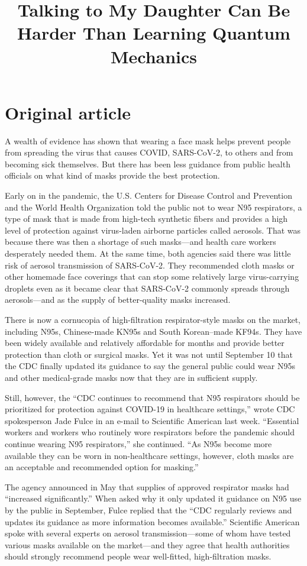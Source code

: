 \documentclass[a4paper, 14pt]{extarticle}
\title{Talking to My Daughter Can Be Harder Than Learning Quantum Mechanics}
\begin{document}

\section*{Original article}
A wealth of evidence has shown that wearing a face mask helps prevent people from spreading the virus that causes COVID, SARS-CoV-2, to others and from becoming sick themselves. But there has been less guidance from public health officials on what kind of masks provide the best protection.

Early on in the pandemic, the U.S. Centers for Disease Control and Prevention and the World Health Organization told the public not to wear N95 respirators, a type of mask that is made from high-tech synthetic fibers and provides a high level of protection against virus-laden airborne particles called aerosols. That was because there was then a shortage of such masks—and health care workers desperately needed them. At the same time, both agencies said there was little risk of aerosol transmission of SARS-CoV-2. They recommended cloth masks or other homemade face coverings that can stop some relatively large virus-carrying droplets even as it became clear that SARS-CoV-2 commonly spreads through aerosols—and as the supply of better-quality masks increased.

There is now a cornucopia of high-filtration respirator-style masks on the market, including N95s, Chinese-made KN95s and South Korean–made KF94s. They have been widely available and relatively affordable for months and provide better protection than cloth or surgical masks. Yet it was not until September 10 that the CDC finally updated its guidance to say the general public could wear N95s and other medical-grade masks now that they are in sufficient supply.

Still, however, the “CDC continues to recommend that N95 respirators should be prioritized for protection against COVID-19 in healthcare settings,” wrote CDC spokesperson Jade Fulce in an e-mail to Scientific American last week. “Essential workers and workers who routinely wore respirators before the pandemic should continue wearing N95 respirators,” she continued. “As N95s become more available they can be worn in non-healthcare settings, however, cloth masks are an acceptable and recommended option for masking.”

The agency announced in May that supplies of approved respirator masks had “increased significantly.” When asked why it only updated it guidance on N95 use by the public in September, Fulce replied that the “CDC regularly reviews and updates its guidance as more information becomes available.”
Scientific American spoke with several experts on aerosol transmission—some of whom have tested various masks available on the market—and they agree that health authorities should strongly recommend people wear well-fitted, high-filtration masks.
\end{document}
